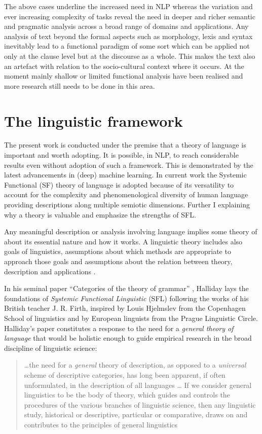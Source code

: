 The above cases underline the increased need in NLP whereas the variation and ever increasing complexity of tasks reveal the need in deeper and richer semantic and pragmatic analysis across a broad range of domains and applications. Any analysis of text beyond the formal aspects such as morphology, lexis and syntax inevitably lead to a functional paradigm of some sort which can be applied not only at the clause level but at the discourse as a whole. This makes the text also an artefact with relation to the socio-cultural context where it occurs. At the moment mainly shallow or limited functional analysis have been realised and more research still needs to be done in this area.

\section{The linguistic framework}
\label{sec:framework}
The present work is conducted under the premise that a theory of language is important and worth adopting. It is possible, in NLP, to reach considerable results even without adoption of such a framework. This is demonstrated by the latest advancements in (deep) machine learning. In current work the Systemic Functional (SF) theory of language is adopted because of its versatility to account for the complexity and phenomenological diversity of human language providing descriptions along multiple semiotic dimensions. Further I explaining why a theory is valuable and emphasize the strengths of SFL.
 
Any meaningful description or analysis involving language implies some theory of about its essential nature and how it works. A linguistic theory includes also goals of linguistics, assumptions about which methods are appropriate to approach those goals and assumptions about the relation between theory, description and applications \citep[3]{Fawcett2000}. 

In his seminal paper ``Categories of the theory of grammar'' \citep{Halliday61-orig}, Halliday lays the foundations of \textit{Systemic Functional Linguistic} (SFL) following the works of his British teacher J. R. Firth, inspired by Louis Hjelmslev \citep{Hjelmslev53} from the Copenhagen School of linguistics and by European linguists from the Prague Linguistic Circle. Halliday's paper constitutes a response to the need for a \textit{general theory of language} that would be holistic enough to guide empirical research in the broad discipline of linguistic science:
\begin{quotation}
    \dots the need for a \textit{general} theory of description, as opposed to a \textit{universal} scheme of descriptive categories, has long been apparent, if often unformulated, in the description of all languages \citep[54; emphasis in original]{Halliday57}
    \dots
    If we consider general linguistics to be the body of theory, which guides and controls the procedures of the various branches of linguistic science, then any linguistic study, historical or descriptive, particular or comparative, draws on and contributes to the principles of general linguistics \citep[55]{Halliday57}
\end{quotation} 

